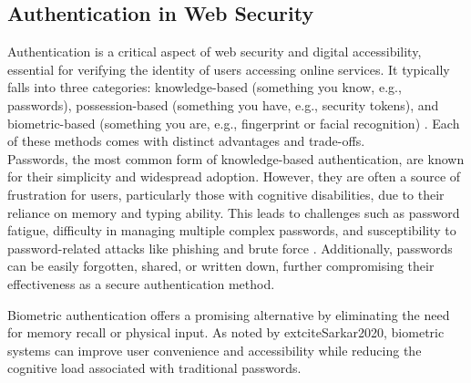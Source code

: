 \subsection{Authentication in Web Security}
Authentication is a critical aspect of web security and digital accessibility, essential for verifying the identity of users accessing online services. It typically falls into three categories: knowledge-based (something you know, e.g., passwords), possession-based (something you have, e.g., security tokens), and biometric-based (something you are, e.g., fingerprint or facial recognition) \autocite{Pant2022}. Each of these methods comes with distinct advantages and trade-offs.\\
Passwords, the most common form of knowledge-based authentication, are known for their simplicity and widespread adoption. However, they are often a source of frustration for users, particularly those with cognitive disabilities, due to their reliance on memory and typing ability. This leads to challenges such as password fatigue, difficulty in managing multiple complex passwords, and susceptibility to password-related attacks like phishing and brute force \autocite{Rochford2014}. Additionally, passwords can be easily forgotten, shared, or written down, further compromising their effectiveness as a secure authentication method.

Biometric authentication offers a promising alternative by eliminating the need for memory recall or physical input. As noted by 	extcite{Sarkar2020}, biometric systems can improve user convenience and accessibility while reducing the cognitive load associated with traditional passwords.

